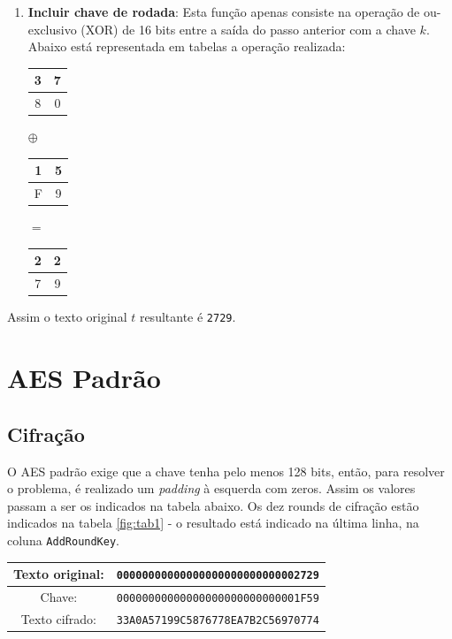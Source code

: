 \documentclass{article}
\begin{document}
\begin{enumerate}
    \item \textbf{Incluir chave de rodada}: Esta função apenas consiste na
    operação de ou-exclusivo (XOR) de 16 bits entre a saída do passo anterior
    com a chave $k$. Abaixo está representada em tabelas a operação realizada:
    \begin{center}
        \begin{tabular}{|c|c|}
            \hline
            3 & 7 \\
            \hline
            8 & 0 \\
            \hline
        \end{tabular}
        $\oplus$
        \begin{tabular}{|c|c|}
            \hline
            1 & 5 \\
            \hline
            F & 9 \\
            \hline
        \end{tabular}
        $=$
        \begin{tabular}{|c|c|}
            \hline
            2 & 2  \\
            \hline
            7 & 9 \\
            \hline
        \end{tabular}
    \end{center}
\end{enumerate}
Assim o texto original $t$ resultante é \texttt{2729}.

\section{AES Padrão}
\subsection{Cifração}
O AES padrão exige que a chave tenha pelo menos 128 bits, então, para resolver
o problema, é realizado um \textit{padding} à esquerda com zeros. Assim os
valores passam a ser os indicados na tabela abaixo. Os dez rounds de cifração
estão indicados na tabela \ref{fig:tab1} - o resultado está indicado na última
linha, na coluna \texttt{AddRoundKey}.
\begin{center}
    \begin{tabular}{|c|c|}
        \hline
        Texto original: & \texttt{00000000000000000000000000002729} \\
        \hline
        Chave: & \texttt{00000000000000000000000000001F59} \\
        \hline
        Texto cifrado: & \texttt{33A0A57199C5876778EA7B2C56970774} \\
        \hline
    \end{tabular}
\end{center}
\end{document}
